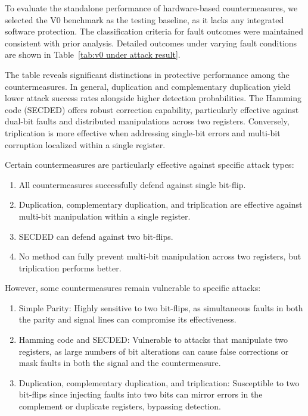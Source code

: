 To evaluate the standalone performance of hardware-based countermeasures, we selected the V0 benchmark as the testing baseline, as it lacks any integrated software protection. The classification criteria for fault outcomes were maintained consistent with prior analysis. Detailed outcomes under varying fault conditions are shown in Table~\ref{tab:v0 under attack result}.

The table reveals significant distinctions in protective performance among the countermeasures. In general, duplication and complementary duplication yield lower attack success rates alongside higher detection probabilities. The Hamming code (SECDED) offers robust correction capability, particularly effective against dual-bit faults and distributed manipulations across two registers. Conversely, triplication is more effective when addressing single-bit errors and multi-bit corruption localized within a single register.

Certain countermeasures are particularly effective against specific attack types:
\begin{enumerate}
\item All countermeasures successfully defend against single bit-flip.
\item Duplication, complementary duplication, and triplication are effective against multi-bit manipulation within a single register.
\item SECDED can defend against two bit-flips.
\item No method can fully prevent multi-bit manipulation across two registers, but triplication performs better.
\end{enumerate}
However, some countermeasures remain vulnerable to specific attacks:
\begin{enumerate}
\item Simple Parity: Highly sensitive to two bit-flips, as simultaneous faults in both the parity and signal lines can compromise its effectiveness.
\item Hamming code and SECDED: Vulnerable to attacks that manipulate two registers, as large numbers of bit alterations can cause false corrections or mask faults in both the signal and the countermeasure.
\item Duplication, complementary duplication, and triplication: Susceptible to two bit-flips since injecting faults into two bits can mirror errors in the complement or duplicate registers, bypassing detection.
\end{enumerate}

